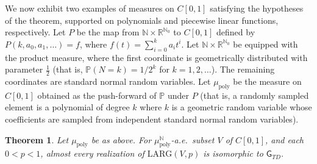 \documentclass{daj}
\newtheorem{thm}{Theorem}
\newcommand{\LARG}{\mathrm{LARG}}
\newcommand{\N}{\mathbb N}
\newcommand{\R}{\mathbb R}
\newcommand{\PP}{\mathbb P}
\begin{document}
We now exhibit two examples of measures on $C[0,1]$ satisfying the
hypotheses of the theorem, supported on polynomials
and piecewise linear functions, respectively. Let $P$ be the map from $\N\times \R^{\N_0}$ to $C[0,1]$ defined by $P(k,a_0,a_1,\ldots)=f$,
where $f(t)=\sum_{i=0}^k a_it^i$. Let $\N\times\R^{\N_0}$ be equipped with the product measure,
where the first coordinate is
geometrically distributed with parameter $\frac 12$ (that is, $\PP(N=k)=1/2^k$ for $k=1,2,\ldots$). The remaining coordinates are standard normal random variables.
Let $\mu_\text{poly}$ be the measure on
$C[0,1]$ obtained as the push-forward of $\PP$ under $P$ (that is, a randomly sampled element
is a polynomial of degree $k$ where $k$ is a geometric random variable whose coefficients are
sampled from independent standard normal random variables).

\begin{thm}\label{thm:polytd}
Let $\mu_\text{poly}$ be as above. For $\mu_\text{poly}^\N$-a.e.\ subset $V$ of $C[0,1]$,
and each $0<p<1$, almost every realization of $\LARG(V,p)$ is isomorphic to $\mathsf{G}_{TD}$.
\end{thm}
\end{document}
